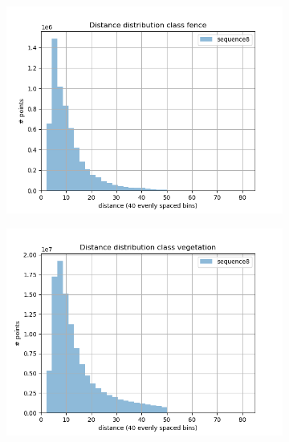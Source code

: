 \begin{figure}[h]
\begin{subfigure}[b]{0.24\textwidth}
         \includegraphics[width=\textwidth]{Figures/Chapter4/dist-height/dist/test/class14.png}
     \end{subfigure}
     \hfill
     \begin{subfigure}[b]{0.24\textwidth}
         \centering
         \includegraphics[width=\textwidth]{Figures/Chapter4/dist-height/dist/test/class15.png}
     \end{subfigure}
     \begin{subfigure}[b]{0.24\textwidth}
         \centering

\end{subfigure}
\end{figure}
